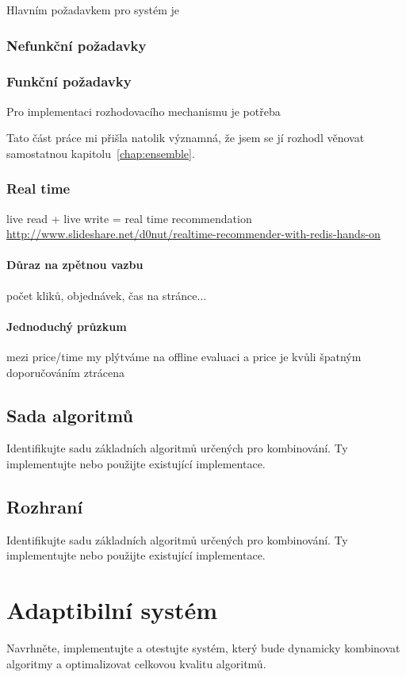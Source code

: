 \documentclass[thesis=M,czech]{FITthesis}[2014/05/07]
\begin{document}
Hlavním požadavkem pro systém je 

\subsection{Nefunkční požadavky}

\subsection{Funkční požadavky}

Pro implementaci rozhodovacího mechanismu je potřeba 

Tato část práce mi přišla natolik významná, že jsem se jí rozhodl věnovat samostatnou kapitolu~\ref{chap:ensemble}. 
	
	\subsection{Real time}
	live read + live write = real time recommendation
	\url{http://www.slideshare.net/d0nut/realtime-recommender-with-redis-hands-on}	
	
	\subsubsection{Důraz na zpětnou vazbu}
	počet kliků, objednávek, čas na stránce...
	\subsubsection{Jednoduchý průzkum}
	mezi price/time my plýtváme na offline evaluaci a price je kvůli špatným doporučováním ztrácena	
	
\section{Sada algoritmů}
Identifikujte sadu základních algoritmů určených pro kombinování. Ty implementujte nebo použijte existující implementace.			

\section{Rozhraní}
Identifikujte sadu základních algoritmů určených pro kombinování. Ty implementujte nebo použijte existující implementace.		
			
\chapter{Adaptibilní systém}
Navrhněte, implementujte a otestujte systém, který bude dynamicky kombinovat algoritmy a optimalizovat celkovou kvalitu algoritmů.
\label{chap:ensemble}
\end{document}
